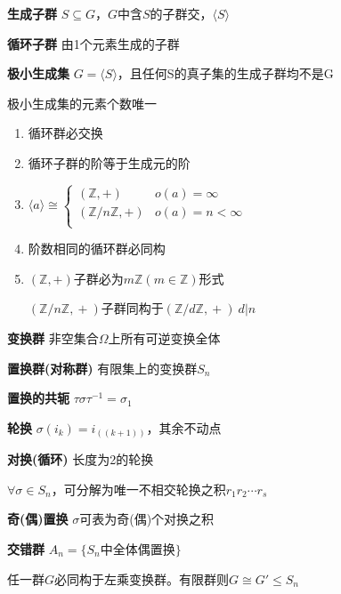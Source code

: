 \documentclass[a4paper,10pt]{ctexart}
\newcommand*{\setZ}{\mathbb{Z}}
\renewcommand*{\leq}{\leqslant}
\newcommand*{\gengroup}[1]{\langle #1 \rangle}
\begin{document}
\begin{multicols}{3}
    \textbf{生成子群} $S \!\subseteq\! G$，$G$中含$S$的子群交，$\gengroup{S}$

    \textbf{循环子群} 由1个元素生成的子群

    \textbf{极小生成集} $G \! = \! \gengroup{S}$，且任何S的真子集的生成子群均不是G

    极小生成集的元素个数唯一

    \begin{theorem}[循环群性质]
        \hfil

        \begin{enumerate}
            \item 循环群必交换
            \item 循环子群的阶等于生成元的阶
            \item $\gengroup{a} \cong \begin{cases}
                          (\setZ, +)        & o(a)=\infty       \\
                          (\setZ/n\setZ, +) & o(a) = n < \infty \\
                      \end{cases}$
            \item 阶数相同的循环群必同构
            \item $(\setZ, +)\!$子群必为$m\setZ(m \!\in\! \setZ)$形式

                  $(\setZ/n\setZ,\! +)\!$子群同构于$\!(\setZ/d\setZ,\! +)\  d|n$
        \end{enumerate}
    \end{theorem}

    \textbf{变换群} 非空集合$\Omega$上所有可逆变换全体

    \textbf{置换群(对称群)} 有限集上的变换群$S_n$

    \textbf{置换的共轭} $\tau \sigma \tau^{-1} = \sigma_1$

    \textbf{轮换} $\sigma(i_k) = i_{((k+1))}$，其余不动点

    \textbf{对换(循环)} 长度为2的轮换

    \begin{theorem}[标准轮换分解]
        $\forall \sigma \in S_n$，可分解为唯一不相交轮换之积$r_1 r_2 \cdots r_s$
    \end{theorem}

    \textbf{奇(偶)置换} $\sigma$可表为奇(偶)个对换之积

    \textbf{交错群} $A_n = \{ S_n \text{中全体偶置换} \}$

    \begin{theorem}[Cayley定理]
        任一群$G$必同构于左乘变换群。有限群则$G \!\cong\! G' \!\leq\! S_n$
    \end{theorem}


\end{multicols}
\end{document}
